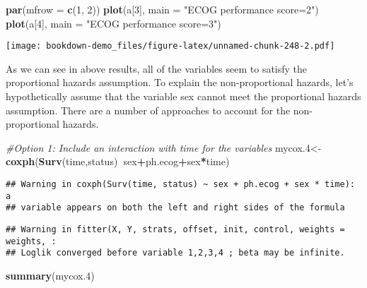 \documentclass[]{book}
\newenvironment{Shaded}{\begin{snugshade}}{\end{snugshade}}
\newcommand{\KeywordTok}[1]{\textcolor[rgb]{0.13,0.29,0.53}{\textbf{#1}}}
\newcommand{\DataTypeTok}[1]{\textcolor[rgb]{0.13,0.29,0.53}{#1}}
\newcommand{\DecValTok}[1]{\textcolor[rgb]{0.00,0.00,0.81}{#1}}
\newcommand{\StringTok}[1]{\textcolor[rgb]{0.31,0.60,0.02}{#1}}
\newcommand{\CommentTok}[1]{\textcolor[rgb]{0.56,0.35,0.01}{\textit{#1}}}
\newcommand{\OperatorTok}[1]{\textcolor[rgb]{0.81,0.36,0.00}{\textbf{#1}}}
\newcommand{\NormalTok}[1]{#1}
\theoremstyle{definition}
\theoremstyle{definition}
\theoremstyle{definition}
\theoremstyle{remark}
\begin{document}
\begin{Shaded}
\begin{Highlighting}[]
\KeywordTok{par}\NormalTok{(}\DataTypeTok{mfrow =} \KeywordTok{c}\NormalTok{(}\DecValTok{1}\NormalTok{, }\DecValTok{2}\NormalTok{))}
\KeywordTok{plot}\NormalTok{(a[}\DecValTok{3}\NormalTok{], }\DataTypeTok{main =} \StringTok{"ECOG performance score=2"}\NormalTok{)}
\KeywordTok{plot}\NormalTok{(a[}\DecValTok{4}\NormalTok{], }\DataTypeTok{main =} \StringTok{"ECOG performance score=3"}\NormalTok{)}
\end{Highlighting}
\end{Shaded}

\texttt{[image: bookdown-demo\_files/figure-latex/unnamed-chunk-248-2.pdf]}

As we can see in above results, all of the variables seem to satisfy the
proportional hazards assumption. To explain the non-proportional
hazards, let's hypothetically assume that the variable sex cannot meet
the proportional hazards assumption. There are a number of approaches to
account for the non-proportional hazards.

\begin{Shaded}
\begin{Highlighting}[]
\CommentTok{#Option 1: Include an interaction with time for the variables}
\NormalTok{mycox.}\DecValTok{4}\NormalTok{<-}\KeywordTok{coxph}\NormalTok{(}\KeywordTok{Surv}\NormalTok{(time,status)}\OperatorTok{~}\NormalTok{sex}\OperatorTok{+}\NormalTok{ph.ecog}\OperatorTok{+}\NormalTok{sex}\OperatorTok{*}\NormalTok{time)}
\end{Highlighting}
\end{Shaded}

\begin{verbatim}
## Warning in coxph(Surv(time, status) ~ sex + ph.ecog + sex * time): a
## variable appears on both the left and right sides of the formula
\end{verbatim}

\begin{verbatim}
## Warning in fitter(X, Y, strats, offset, init, control, weights = weights, :
## Loglik converged before variable 1,2,3,4 ; beta may be infinite.
\end{verbatim}

\begin{Shaded}
\begin{Highlighting}[]
\KeywordTok{summary}\NormalTok{(mycox.}\DecValTok{4}\NormalTok{)}
\end{Highlighting}
\end{Shaded}
\end{document}

